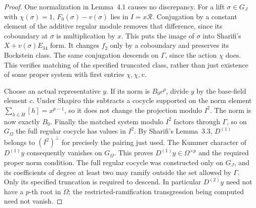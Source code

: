 \documentclass[11pt,a4paper]{article}
\theoremstyle{definition}
\begin{document}
\begin{proof}
One normalization in Lemma~4.1 causes no discrepancy.
For a lift \(\sigma\in G_J\) with \(\chi(\sigma)=1\),
\(F_0(\sigma)-v(\sigma)\) lies in \(I=x\mathcal R\).
Conjugation by a constant element of the additive
regular module removes that difference, since its
coboundary at \(\sigma\) is multiplication by \(x\).
This puts the image of \(\sigma\) into Sharifi's
\(X+v(\sigma)E_{34}\) form.  It changes \(f_2\)
only by a coboundary and preserves its Bockstein class.
The same conjugation descends on \(\Gamma\), since
the action \(\chi\) does.  This verifies matching of
the specified truncated class, rather than just
existence of some proper system with first entries
\(\chi,\chi,v\).

Choose an actual representative \(y\).  If its norm is
\(B_0c^p\), divide \(y\) by the base-field element \(c\).
Under Shapiro this subtracts a cocycle supported on
the norm element
\(\sum_{h\in H}[h]=x^{p-1}\), so it does not change
the projection modulo \(I^2\).  The norm is now
exactly \(B_0\).  Finally the matched system modulo
\(I^2\) factors through \(\Gamma\), so on \(G_\Omega\)
the full regular cocycle has values in \(I^2\).
By Sharifi's Lemma~3.3, \(D^{(1)}\) belongs to
\((I^2)^\perp\) for precisely the pairing just used.
The Kummer character of \(D^{(1)}y\) consequently
vanishes on \(G_\Omega\).  This proves
\(D^{(1)}y\in\Omega^{\times p}\) and the required
proper norm condition.
The full regular cocycle was constructed only on
\(G_J\), and its coefficients of degree at least two
may ramify outside the set allowed by \(\Gamma\).
Only its specified truncation is required to descend.
In particular \(D^{(2)}y\) need not have a \(p\)-th
root in \(\Omega\); the restricted-ramification
transgression being computed need not vanish.
\end{proof}
\end{document}
